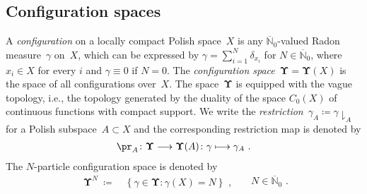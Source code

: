 \documentclass[11pt,letterpaper]{amsart}
\newcommand{\A}{\Sigma} %
\DeclareMathOperator{\eqdef}{\coloneqq}
\newcommand{\longrar}{\longrightarrow}
\newcommand{\set}[1]{\left\{#1\right\}}							%
\newcommand{\paren}[1]{\left(#1\right)}							%
\newcommand{\seq}[1]{\paren{#1}}								%
\newcommand{\N}{{\mathbb N}}
\newcommand{\R}{{\mathbb R}}
\newcommand{\mrestr}[1]{\!\downharpoonright_{#1}}
\newcommand{\comma}{\,\,\mathrm{,}\;\,}
\newcommand{\fstop}{\,\,\mathrm{.}}
\newcommand{\QP}{{\mu}}
\newcommand{\dUpsilon}{{\mathbf \Upsilon}}
\newcommand{\U}{\dUpsilon}
\renewcommand{\1}{\mathbf 1}
\renewcommand{\msE}{\mathscr K}
\numberwithin{equation}{section}
\theoremstyle{plain}
\theoremstyle{definition}
\newtheorem{defs}[thm]{Definition}%
\theoremstyle{remark}
\begin{document}
\subsection{Configuration spaces}%
A \emph{configuration} on a locally compact Polish space~$X$ is any $\overline\N_0$-valued Radon measure~$\gamma$ on~$X$, which can be expressed by $\gamma = \sum_{i=1}^N \delta_{x_i}$ for $N \in \overline{\N}_0$, where $x_i \in X$ for every $i$ and  $\gamma \equiv 0$ if $N=0$.
%
The \emph{configuration space}~$\U=\dUpsilon(X)$ is the space of all configurations over~$X$. The space~$\dUpsilon$ is equipped with the vague topology, i.e., the topology generated by the duality of the space $C_0(X)$ of continuous functions with compact support. We write the {\it restriction}~$\gamma_A\eqdef \gamma\mrestr{A}$ for a Polish subspace~$A \subset X$ and the corresponding restriction map is denoted by 
\begin{align}\label{eq:ProjUpsilon}
\pr_A\colon \dUpsilon\longrar \dUpsilon(A)\colon \gamma\longmapsto \gamma_{A}\fstop
\end{align}
%
The $N$-particle configuration space is denoted by
\begin{equation*}
\begin{aligned}
\dUpsilon^N\ \eqdef&\ \set{\gamma\in \dUpsilon: \gamma(X)=N}\comma
\end{aligned}
\quad N\in\overline\N_0 \fstop
\end{equation*}
\end{document}
